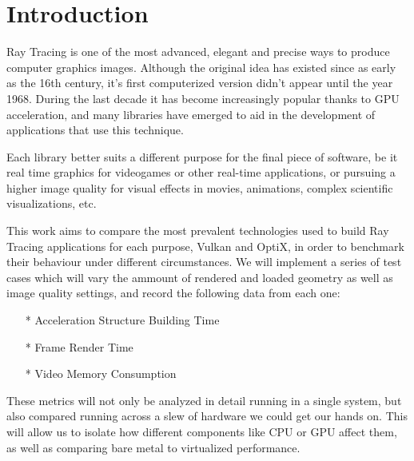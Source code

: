 

\chapter{Introduction}

Ray Tracing is one of the most advanced, elegant and precise ways to produce computer graphics images. Although the original idea has existed since as early as the 16th century, it's first computerized version didn't appear until the year 1968. During the last decade it has become increasingly popular thanks to GPU acceleration, and many libraries have emerged to aid in the development of applications that use this technique.

Each library better suits a different purpose for the final piece of software, be it real time graphics for videogames or other real-time applications, or pursuing a higher image quality for visual effects in movies, animations, complex scientific visualizations, etc.

This work aims to compare the most prevalent technologies used to build Ray Tracing applications for each purpose, Vulkan and OptiX, in order to benchmark their behaviour under different circumstances. We will implement a series of test cases which will vary the ammount of rendered and loaded geometry as well as image quality settings, and record the following data from each one:

\begin{itemize}
    \item[*] Acceleration Structure Building Time
    \item[*] Frame Render Time
    \item[*] Video Memory Consumption
\end{itemize}

These metrics will not only be analyzed in detail running in a single system, but also compared running across a slew of hardware we could get our hands on. This will allow us to isolate how different components like CPU or GPU affect them, as well as comparing bare metal to virtualized performance.

